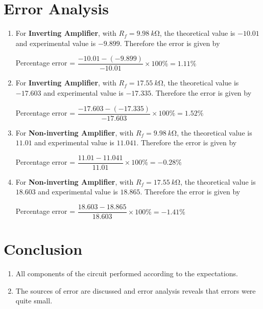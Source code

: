 \section{Error Analysis}
\begin{enumerate}
    \item For \textbf{Inverting Amplifier}, with $R_f = \SI{9.98}{k\ohm}$, the theoretical value is $-10.01$ and experimental value is $-9.899$. Therefore the error is given by
    \begin{center}
        Percentage error = $\dfrac{-10.01-(-9.899)}{-10.01} \times 100 \% = 1.11\%$
    \end{center}
    \item For \textbf{Inverting Amplifier}, with $R_f = \SI{17.55}{k\ohm}$, the theoretical value is $-17.603$ and experimental value is $-17.335$. Therefore the error is given by
    \begin{center}
        Percentage error = $\dfrac{-17.603-(-17.335)}{-17.603} \times 100 \% = 1.52\%$
    \end{center}
    \item For \textbf{Non-inverting Amplifier}, with $R_f = \SI{9.98}{k\ohm}$, the theoretical value is $11.01$ and experimental value is $11.041$. Therefore the error is given by
    \begin{center}
        Percentage error = $\dfrac{11.01-11.041}{11.01} \times 100 \% = -0.28\%$
    \end{center}
    \item For \textbf{Non-inverting Amplifier}, with $R_f = \SI{17.55}{k\ohm}$, the theoretical value is $18.603$ and experimental value is $18.865$. Therefore the error is given by
    \begin{center}
        Percentage error = $\dfrac{18.603-18.865}{18.603} \times 100 \% = -1.41\%$
    \end{center}
\end{enumerate}
\section{Conclusion}
\begin{enumerate}
    \item All components of the circuit performed according to the expectations. 
    \item The sources of error are discussed and error analysis reveals that errors were quite small.
\end{enumerate}